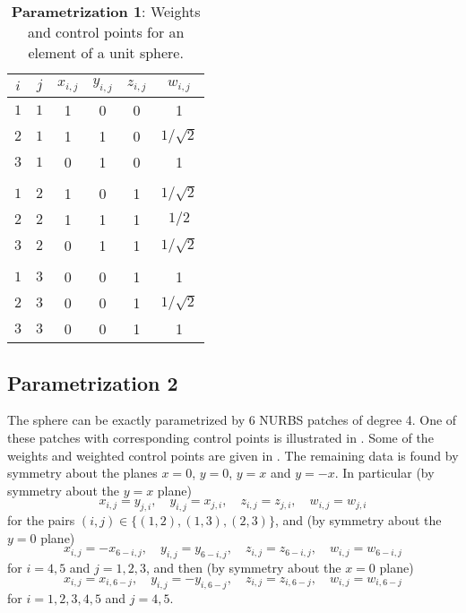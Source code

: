 \begin{table}
	\centering
	\caption{\textbf{Parametrization 1}: Weights and control points for an element of a unit sphere.}
	\label{Tab3:sphere1}
	\begin{tabular}{c c c c c c}
		\toprule
		$i$		& 	$j$	& 	$x_{i,j}$ 	& $y_{i,j}$ 	& $z_{i,j}$ 	& $w_{i,j}$\\
		\hline
		$1$		&	$1$	&	1	& 0		& 0		&	1				\\
		$2$		&	$1$	&	1	& 1		& 0 	&	$1/\sqrt{2}$	\\
		$3$		&	$1$	&	0	& 1		& 0		&	1				\\ \\
		
		$1$		&	$2$	&	1	& 0		& 1		&	$1/\sqrt{2}$				\\
		$2$		&	$2$	&	1	& 1		& 1 	&	$1/2$	\\
		$3$		&	$2$	&	0	& 1		& 1		&	$1/\sqrt{2}$				\\ \\
		
		$1$		&	$3$	&	0	& 0		& 1		&	1				\\
		$2$		&	$3$	&	0	& 0		& 1 	&	$1/\sqrt{2}$	\\
		$3$		&	$3$	&	0	& 0		& 1		&	1				\\
		\bottomrule
	\end{tabular}
\end{table}

\subsection{Parametrization 2}
\label{Sec3:NURBSsphere2}
The sphere can be exactly parametrized \cite[p. 11]{Cobb1988tts} by 6 NURBS patches of degree 4. One of these patches with corresponding control points is illustrated in . Some of the weights and weighted control points are given in . The remaining data is found by symmetry about the planes $x=0$, $y=0$, $y=x$ and $y=-x$. In particular (by symmetry about the $y=x$ plane)
\begin{equation*}
	x_{i,j} = y_{j,i},\quad y_{i,j} = x_{j,i},\quad z_{i,j} = z_{j,i},\quad w_{i,j} = w_{j,i}
\end{equation*}
for the pairs $(i,j) \in\{(1,2),(1,3),(2,3)\}$, and (by symmetry about the $y=0$ plane)
\begin{equation*}
	x_{i,j} = -x_{6-i,j},\quad y_{i,j} = y_{6-i,j},\quad z_{i,j} = z_{6-i,j},\quad w_{i,j} = w_{6-i,j}
\end{equation*}
for $i=4,5$ and $j=1,2,3$, and then (by symmetry about the $x=0$ plane)
\begin{equation*}
	x_{i,j} = x_{i,6-j},\quad y_{i,j} = -y_{i,6-j},\quad z_{i,j} = z_{i,6-j},\quad w_{i,j} = w_{i,6-j}
\end{equation*}
for $i=1,2,3,4,5$ and $j=4,5$.

